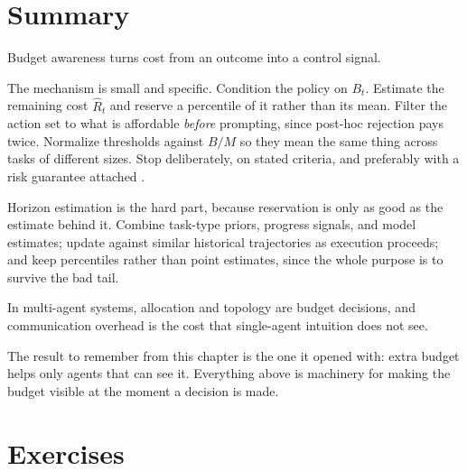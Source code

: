 \section{Summary}

Budget awareness turns cost from an outcome into a control signal.

The mechanism is small and specific. Condition the policy on $B_t$. Estimate the
remaining cost $\hat{R}_t$ and reserve a percentile of it rather than its mean.
Filter the action set to what is affordable \emph{before} prompting, since
post-hoc rejection pays twice. Normalize thresholds against $B/M$ so they mean
the same thing across tasks of different sizes. Stop deliberately, on stated
criteria, and preferably with a risk guarantee attached
\cite{conformalthinking2026}.

Horizon estimation is the hard part, because reservation is only as good as the
estimate behind it. Combine task-type priors, progress signals, and model
estimates; update against similar historical trajectories as execution proceeds;
and keep percentiles rather than point estimates, since the whole purpose is to
survive the bad tail.

In multi-agent systems, allocation and topology are budget decisions, and
communication overhead is the cost that single-agent intuition does not see.

The result to remember from this chapter is the one it opened with: extra budget
helps only agents that can see it. Everything above is machinery for making the
budget visible at the moment a decision is made.

\section*{Exercises}

